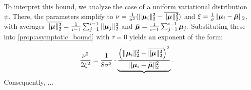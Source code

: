 To interpret this bound, we analyze the case of a uniform variational distribution $\psi$.
There, the parameters simplify to $\nu = \frac{1}{\sigma^2} (\|{\bm{\mu}}_i\|_2^2 - \overline{\|{\bm{\mu}}\|_2^2})$ and $\xi = \frac{1}{\sigma} \|{\bm{\mu}}_i - \bar{{\bm{\mu}}}\|_2$,
with averages $\overline{\|{\bm{\mu}}\|_2^2} = \frac{1}{i-1} \sum_{j=1}^{i-1} ||{\bm{\mu}}_j||_2^2$ and  $\bar{{\bm{\mu}}} = \frac{1}{i-1} \sum_{j=1}^{i-1} {\bm{\mu}}_j$.
Substituting these into \cref{prop:asymptotic_bound} with $\tau=0$ yields an exponent of the form:
\begin{equation}
    \frac{\nu^2}{2\xi^2} = \frac{1}{8\sigma^2} \cdot \underbrace{\frac{ \left( \|{\bm{\mu}}_i\|_2^2 - \overline{\|{\bm{\mu}}\|_2^2} \right)^2 }{ \|{\bm{\mu}}_i - \bar{{\bm{\mu}}}\|_2^2 }}.
\end{equation}
Consequently, ...

\clearpage


\fi



